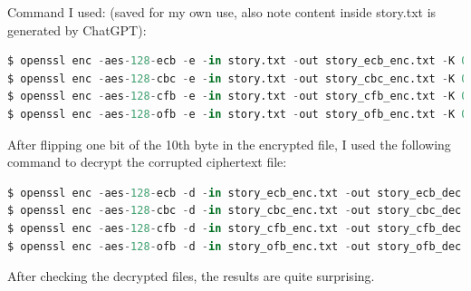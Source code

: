 \documentclass{article}
\begin{document}
Command I used: (saved for my own use, also note content inside story.txt is generated by ChatGPT):
\begin{lstlisting}[language=Python]
$ openssl enc -aes-128-ecb -e -in story.txt -out story_ecb_enc.txt -K 00112233445566778889aabbccddeeff
$ openssl enc -aes-128-cbc -e -in story.txt -out story_cbc_enc.txt -K 00112233445566778889aabbccddeeff -iv 0102030405060708090a0b0c0d0e0f10
$ openssl enc -aes-128-cfb -e -in story.txt -out story_cfb_enc.txt -K 00112233445566778889aabbccddeeff -iv 0102030405060708090a0b0c0d0e0f10
$ openssl enc -aes-128-ofb -e -in story.txt -out story_ofb_enc.txt -K 00112233445566778889aabbccddeeff -iv 0102030405060708090a0b0c0d0e0f10
\end{lstlisting}
After flipping one bit of the 10th byte in the encrypted file, I used the following command to decrypt the corrupted ciphertext file:
\begin{lstlisting}[language=Python]
$ openssl enc -aes-128-ecb -d -in story_ecb_enc.txt -out story_ecb_dec.txt -K 00112233445566778889aabbccddeeff
$ openssl enc -aes-128-cbc -d -in story_cbc_enc.txt -out story_cbc_dec.txt -K 00112233445566778889aabbccddeeff -iv 0102030405060708090a0b0c0d0e0f10
$ openssl enc -aes-128-cfb -d -in story_cfb_enc.txt -out story_cfb_dec.txt -K 00112233445566778889aabbccddeeff -iv 0102030405060708090a0b0c0d0e0f10
$ openssl enc -aes-128-ofb -d -in story_ofb_enc.txt -out story_ofb_dec.txt -K 00112233445566778889aabbccddeeff -iv 0102030405060708090a0b0c0d0e0f10
\end{lstlisting}
After checking the decrypted files, the results are quite surprising.
\end{document}
